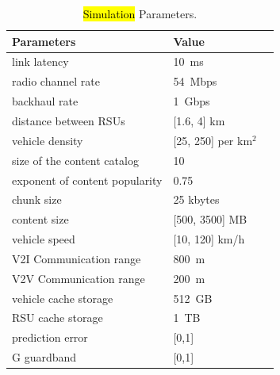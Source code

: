 \documentclass[electronics,aricle,accept,pdftex,moreauthors]{Definitions/mdpi}
\begin{document}
\begin{table}[H] %
    \caption{\hl{Simulation} %
 Parameters.}
\begin{tabularx}{\textwidth}{CCC}
\toprule

        \textbf{Parameters} & \textbf{Value} \\
     \midrule

        link latency & 10~ms\\
        radio channel rate & 54~Mbps\\
        backhaul rate & 1~Gbps\\
        distance between RSUs & [1.6, 4] km\\
        vehicle density & [25, 250] per {km}$^{2}$\\
        size of the content catalog & 10\\
        exponent of content popularity & 0.75\\
        chunk size & 25 kbytes\\
        content size & [500, 3500] MB\\
        vehicle speed & [10, 120] km/h\\
        V2I Communication range & 800~m\\
        V2V Communication range & 200~m\\
        vehicle cache storage & 512~GB\\
        RSU cache storage & 1~TB\\
        prediction error & [0,1]\\
        G guardband & [0,1]\\
     \bottomrule

    \end{tabularx}
    \label{table4}
\end{table}
\end{document}
